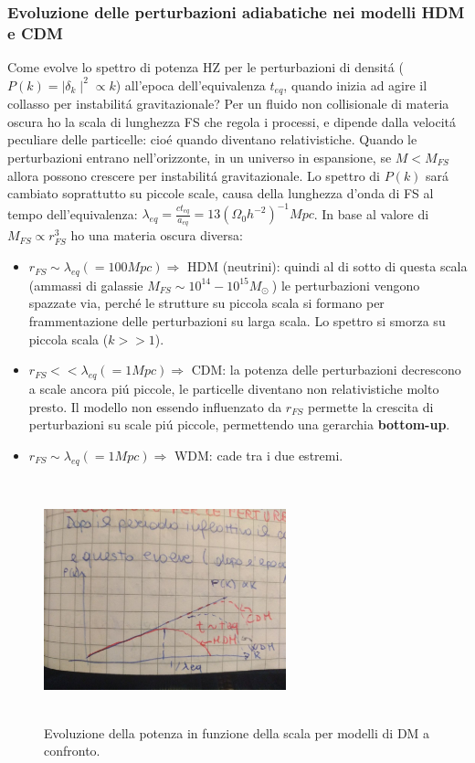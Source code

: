 \documentclass[12pt, a4paper]{article}
\begin{document}
\subsubsection{Evoluzione delle perturbazioni adiabatiche nei modelli HDM e CDM}
Come evolve lo spettro di potenza HZ per le perturbazioni di densit\'{a} ($P(k)=\mid \delta_k\mid^2\propto k$) all'epoca dell'equivalenza $t_{eq}$, quando inizia ad agire il collasso per instabilit\'{a} gravitazionale?
Per un fluido non collisionale di materia oscura ho la scala di lunghezza FS che regola i processi, e dipende dalla velocit\'{a} peculiare delle particelle: cio\'{e} quando diventano relativistiche. Quando le perturbazioni entrano nell'orizzonte, in un universo in espansione, se $M<M_{FS}$ allora possono crescere per instabilit\'{a} gravitazionale. Lo spettro di $P(k)$ sar\'{a} cambiato soprattutto su piccole scale, causa della lunghezza d'onda di FS al tempo dell'equivalenza: $\lambda_{eq}=\frac{ct_{eq}}{a_{eq}}=13(\Omega_0 h^{-2})^{-1}Mpc$. In base al valore di $M_{FS} \propto r_{FS}^3$ ho una materia oscura diversa:
\begin{itemize}
\item $r_{FS}\sim \lambda_{eq} (=100 Mpc) \Rightarrow$ HDM (neutrini): quindi al di sotto di questa scala (ammassi di galassie $M_{FS}\sim 10^{14}-10^{15} M_\odot\ $) le perturbazioni vengono spazzate via, perch\'{e} le strutture su piccola scala si formano per frammentazione delle perturbazioni su larga scala. Lo spettro si smorza su  piccola scala ($k>>1$).
\item $r_{FS}<< \lambda_{eq} (=1 Mpc) \Rightarrow$ CDM: la potenza delle perturbazioni decrescono a scale ancora pi\'{u} piccole, le particelle diventano non relativistiche molto presto. Il modello non essendo influenzato da $r_{FS}$ permette la crescita di perturbazioni su scale pi\'{u} piccole, permettendo una gerarchia \textbf{bottom-up}.
\item $r_{FS}\sim \lambda_{eq} (=1 Mpc) \Rightarrow$ WDM: cade tra i due estremi.
\end{itemize}
\begin{figure}[htp]
\centering
\includegraphics[width=7cm, height=7cm]{images/cdm.jpeg}
\caption{Evoluzione della potenza in funzione della scala per modelli di DM a confronto.}
\label{fig:cdm}
\end{figure}
\end{document}

